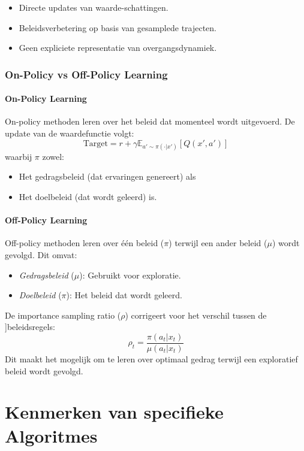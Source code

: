 \documentclass[a4paper,12pt]{report}
\begin{document}
\begin{itemize}
    \item Directe updates van waarde-schattingen.
    \item Beleidsverbetering op basis van gesamplede trajecten.
    \item Geen expliciete representatie van overgangsdynamiek.
\end{itemize}

\subsection{On-Policy vs Off-Policy Learning}
\subsubsection{On-Policy Learning}
On-policy methoden leren over het beleid dat momenteel wordt uitgevoerd. De
update van de waardefunctie volgt:
\[
    \text{Target} = r + \gamma \mathbb{E}_{a' \sim \pi(\cdot|x')}[Q(x',a')]
\]
waarbij \(\pi\) zowel:

\begin{itemize}
    \item Het gedragsbeleid (dat ervaringen genereert) als
    \item Het doelbeleid (dat wordt geleerd) is.
\end{itemize}

\subsubsection{Off-Policy Learning}
Off-policy methoden leren over één beleid (\(\pi\)) terwijl een ander beleid
(\(\mu\)) wordt gevolgd. Dit omvat:

\begin{itemize}
    \item \textit{Gedragsbeleid} (\(\mu\)): Gebruikt voor exploratie.
    \item \textit{Doelbeleid} (\(\pi\)): Het beleid dat wordt geleerd.
\end{itemize}

De importance sampling ratio (\(\rho\)) corrigeert voor het verschil tussen de
]beleidsregels:
\[
    \rho_t = \frac{\pi(a_t|x_t)}{\mu(a_t|x_t)}
\]
Dit maakt het mogelijk om te leren over optimaal gedrag terwijl een exploratief
beleid wordt gevolgd.

\chapter{Kenmerken van specifieke Algoritmes}
\end{document}
